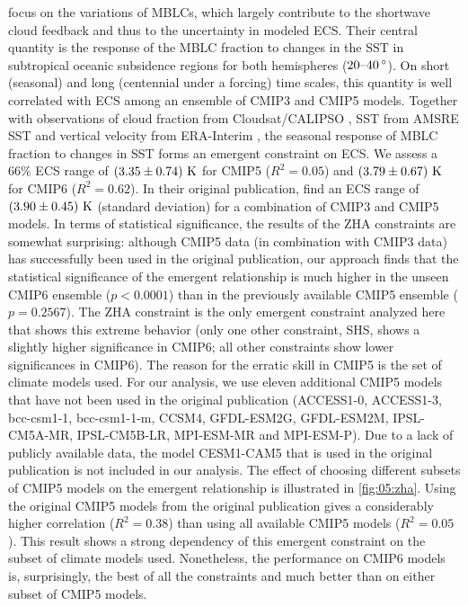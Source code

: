 \textcite{Zhai2015} focus on the variations of \acp{MBLC}, which largely
contribute to the shortwave cloud feedback and thus to the uncertainty in
modeled \ac{ECS}. Their central quantity is the response of the \ac{MBLC}
fraction to changes in the \ac{SST} in subtropical oceanic subsidence regions
for both hemispheres ($\rangeunit{20}{40}{\degree}$). On short (seasonal) and
long (centennial under a forcing) time scales, this quantity is well correlated
with \ac{ECS} among an ensemble of \acs{CMIP}3 and \acs{CMIP}5 models. Together
with observations of cloud fraction from Cloudsat/CALIPSO \autocite{Mace2009},
\ac{SST} from AMSRE \ac{SST} \autocite{AMSRE2011} and vertical velocity from
ERA-Interim \autocite{Dee2011}, the seasonal response of \ac{MBLC} fraction to
changes in \ac{SST} forms an emergent constraint on \ac{ECS}. We assess a $66
\unit{\%}$ \ac{ECS} range of $\pmrangeunit{3.35}{0.74}{K}$ for \acs{CMIP}5
($R^2 = 0.05$) and $\pmrangeunit{3.79}{0.67}{K}$ for \acs{CMIP}6 ($R^2 =
0.62$). In their original publication, \textcite{Zhai2015} find an \ac{ECS}
range of $\pmrangeunit{3.90}{0.45}{K}$ (standard deviation) for a combination
of \acs{CMIP}3 and \acs{CMIP}5 models. In terms of statistical significance,
the results of the ZHA constraints are somewhat surprising: although
\acs{CMIP}5 data (in combination with \acs{CMIP}3 data) has successfully been
used in the original publication, our approach finds that the statistical
significance of the emergent relationship is much higher in the unseen
\acs{CMIP}6 ensemble ($p < 0.0001$) than in the previously available
\acs{CMIP}5 ensemble ($p = 0.2567$). The ZHA constraint is the only emergent
constraint analyzed here that shows this extreme behavior (only one other
constraint, SHS, shows a slightly higher significance in \acs{CMIP}6; all other
constraints show lower significances in \acs{CMIP}6). The reason for the
erratic skill in \acs{CMIP}5 is the set of climate models used. For our
analysis, we use eleven additional \acs{CMIP}5 models that have not been used
in the original publication (ACCESS1-0, ACCESS1-3, bcc-csm1-1, bcc-csm1-1-m,
CCSM4, GFDL-ESM2G, GFDL-ESM2M, IPSL-CM5A-MR, IPSL-CM5B-LR, MPI-ESM-MR and
MPI-ESM-P). Due to a lack of publicly available data, the model
\acs{CESM}1-CAM5 that is used in the original publication is not included in
our analysis. The effect of choosing different subsets of \acs{CMIP}5 models on
the emergent relationship is illustrated in \cref{fig:05:zha}. Using the
original \acs{CMIP}5 models from the original publication gives a considerably
higher correlation ($R^2 = 0.38$) than using all available \acs{CMIP}5 models
($R^2 = 0.05$). This result shows a strong dependency of this emergent
constraint on the subset of climate models used. Nonetheless, the performance
on \acs{CMIP}6 models is, surprisingly, the best of all the constraints and
much better than on either subset of \acs{CMIP}5 models.


